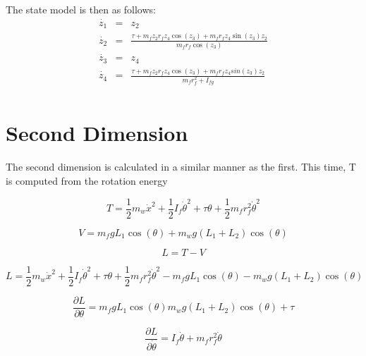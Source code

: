 \documentclass{article}
\begin{document}
The state model is then as follows:
\begin{eqnarray}
\dot{z_{1}} &=& z_{2} \nonumber \\
\dot{z_{2}} &=& \frac{\tau + m_{f} z_{2} r_{f} z_{4}  \cos(z_{3}) + m_{f} r_{f} z_{4} \sin(z_{3}) z_{2}}{m_{f} r_{f} \cos(z_{3})} \nonumber \\
\dot{z_{3}} &=& z_{4} \nonumber \\
\dot{z_{4}} &=& \frac{\tau + m_{f} z_{2} r_{f} z_{4} \cos(z_{3}) + m_{f} r_{f} z_{4} sin(z_{3}) z_{2}}{m_{f} r_{f}^2 + I_{fg}} \nonumber \\
\end{eqnarray}

\newpage

 
\section{Second Dimension}
The second dimension is calculated in a similar manner as the first.  This time, T is computed from the rotation energy 
 
 
\begin{equation}
T = \frac{1}{2} m_{w} \dot{x}^2 + \frac{1}{2} I_{f} \dot{\theta}^2 + \tau \theta + \frac{1}{2} m_{f} r_{f}^2 \dot{\theta}^2
\end{equation}

\begin{equation}
V = m_{f} g L_{1} \cos(\theta) + m_{w} g (L_{1} + L_{2}) \cos(\theta)
\end{equation}

\begin{equation}
L = T - V
\end{equation}

\begin{equation}
L = \frac{1}{2} m_{w} \dot{x}^2 + \frac{1}{2} I_{f} \dot{\theta}^2 + \tau \theta + \frac{1}{2} m_{f} r_{f}^2 \dot{\theta}^2 - m_{f} g L_{1} \cos(\theta) - m_{w} g (L_{1} + L_{2}) \cos(\theta)
\end{equation}

\begin{equation}
\frac{\partial{L}}{\partial{{\theta}}} =  m_{f} g L_{1} \cos(\theta)  m_{w} g (L_{1} + L_{2}) \cos(\theta) + \tau
\end{equation}

\begin{equation}
\frac{\partial{L}}{\partial{\dot{\theta}}} = I_{f} \dot{\theta} + m_{f} r_{f}^2 \dot{\theta}
\end{equation}
\end{document}
